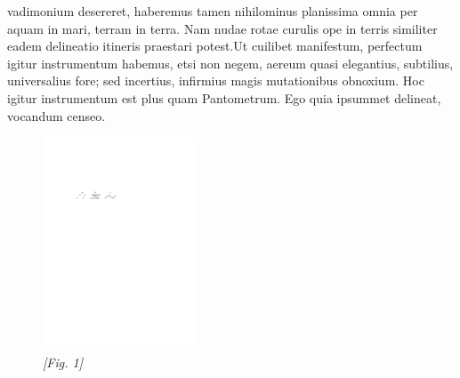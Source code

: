 vadimonium desereret, haberemus tamen nihilominus planissima omnia per aquam in mari, terram in terra. Nam nudae rotae\protect{} curulis ope in terris similiter eadem delineatio itineris praestari potest.\pend \pstart Ut cuilibet manifestum, perfectum igitur instrumentum habemus, etsi non negem, aereum quasi elegantius, subtilius, universalius fore; sed incertius, infirmius magis mutationibus obnoxium. Hoc igitur instrumentum est plus quam Pantometrum\protect{}. Ego quia ipsummet delineat,  vocandum censeo.\pend \pstart 
   \begin{figure}          \includegraphics[width=0.4\textwidth]{images/35_15_6_48r1}
   \\\centering\textit{[Fig. 1]}
   \end{figure}
